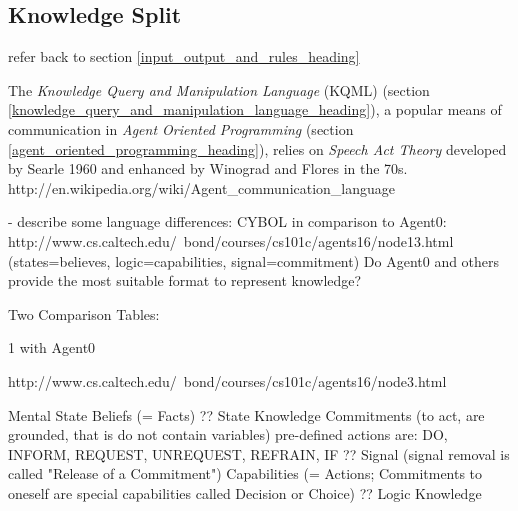 %
%
%
%
%
%
%

\subsection{Knowledge Split}
\label{knowledge_split_heading}

refer back to section \ref{input_output_and_rules_heading}

The \emph{Knowledge Query and Manipulation Language} (KQML) (section
\ref{knowledge_query_and_manipulation_language_heading}), a popular means of
communication in \emph{Agent Oriented Programming} (section
\ref{agent_oriented_programming_heading}), relies on \emph{Speech Act Theory}
developed by Searle 1960 and enhanced by Winograd and Flores in the 70s.
\cite{wikipedia} http://en.wikipedia.org/wiki/Agent\_communication\_language

- describe some language differences: CYBOL in comparison to Agent0:
http://www.cs.caltech.edu/~bond/courses/cs101c/agents16/node13.html
(states=believes, logic=capabilities, signal=commitment)
Do Agent0 and others provide the most suitable format to represent knowledge?

Two Comparison Tables:

1 with Agent0

http://www.cs.caltech.edu/~bond/courses/cs101c/agents16/node3.html

Mental State
    Beliefs (= Facts)
        ?? State Knowledge
    Commitments (to act, are grounded, that is do not contain variables)
        pre-defined actions are: DO, INFORM, REQUEST, UNREQUEST, REFRAIN, IF
        ?? Signal (signal removal is called "Release of a Commitment")
    Capabilities (= Actions; Commitments to oneself are special capabilities called Decision or Choice)
        ?? Logic Knowledge

